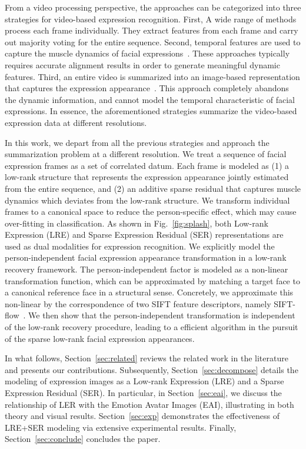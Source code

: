 \documentclass[journal]{IEEEtran}
\begin{document}
From a video processing perspective, the approaches can be categorized into three strategies for video-based expression recognition. First, A wide range of methods~\cite{Bartlett_FG11}\cite{Valstar_SMCB12} process each frame individually. They extract features from each frame and carry out majority voting for the entire sequence. Second, temporal features are used to capture the muscle dynamics of facial expressions~\cite{Zhao_PAMI07}\cite{Huang11}. These approaches typically requires accurate alignment results in order to generate meaningful dynamic features. Third, an entire video is summarized into an image-based representation that captures the expression appearance~\cite{Yang_SMCB12}\cite{Dahmane_TMM14}. This approach completely abandons the dynamic information, and cannot model the temporal characteristic of facial expressions. In essence, the aforementioned strategies summarize the video-based expression data at different resolutions. 

In this work, we depart from all the previous strategies and approach the summarization problem at a different resolution. We treat a sequence of facial expression frames as a set of correlated datum. Each frame is modeled as (1) a low-rank structure that represents the expression appearance jointly estimated from the entire sequence, and (2) an additive sparse residual that captures muscle dynamics which deviates from the low-rank structure. We transform individual frames to a canonical space to reduce the person-specific effect, which may cause over-fitting in classification. As shown in Fig.~\ref{fig:splash}, both Low-rank Expression (LRE) and Sparse Expression Residual (SER) representations are used as dual modalities for expression recognition. We explicitly model the person-independent facial expression appearance transformation in a low-rank recovery framework. The person-independent factor is modeled as a non-linear transformation function, which can be approximated by matching a target face to a canonical reference face in a structural sense. Concretely, we approximate this non-linear by the correspondence of two SIFT feature descriptors, namely SIFT-flow~\cite{Liu_PAMI11}. We then show that the person-independent transformation is independent of the low-rank recovery procedure, leading to a efficient algorithm in the pursuit of the sparse low-rank facial expression appearances. 

In what follows, Section~\ref{sec:related} reviews the related work in the literature and presents our contributions. Subsequently, Section~\ref{sec:decompose} details the modeling of expression images as a Low-rank Expression (LRE) and a Sparse Expression Residual (SER). In particular, in Section~\ref{sec:eai}, we discuss the relationship of LER with the Emotion Avatar Images (EAI), illustrating in both theory and visual results. Section~\ref{sec:exp} demonstrates the effectiveness of LRE+SER modeling via extensive experimental results. Finally, Section~\ref{sec:conclude} concludes the paper.
\end{document}
